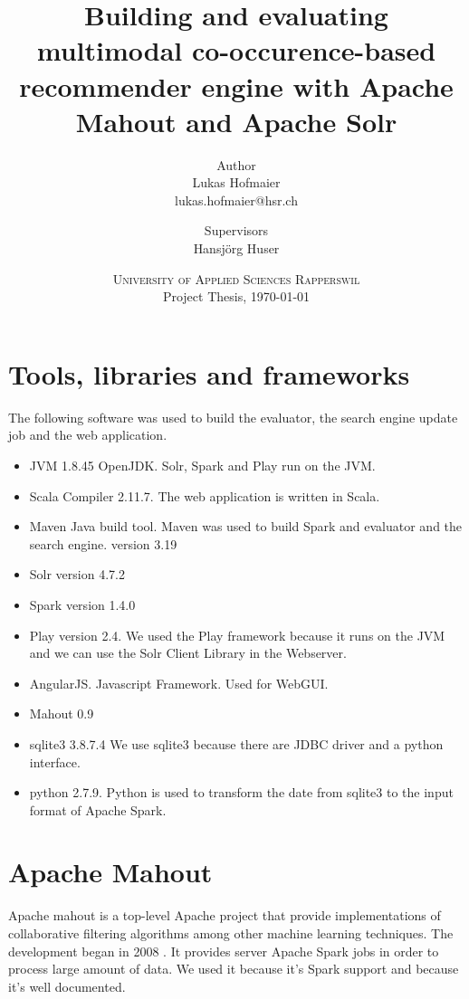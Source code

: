 \documentclass[twoside,a4paper]{article}
\title{ Building and evaluating multimodal co-occurence-based recommender engine with Apache Mahout and Apache Solr }
\author{
	Author \\
	Lukas Hofmaier \\
	lukas.hofmaier@hsr.ch
 	\and
	Supervisors \\
        Hansj\"org Huser
}
\date{
	\textsc{University of Applied Sciences Rapperswil}\\
	Project Thesis,
	\today
}
\begin{document}
\lstset{
basicstyle=\ttfamily,
columns=fullflexible,
keepspaces=true,
captionpos=b
}

\maketitle
\tableofcontents








\appendix

\section{Tools, libraries and frameworks}

The following software was used to build the evaluator, the search engine update job and the web application.
\begin{itemize}
\item JVM 1.8.45 OpenJDK. Solr, Spark and Play run on the JVM.
\item Scala Compiler 2.11.7. The web application is written in Scala.
\item Maven Java build tool. Maven was used to build Spark and evaluator and the search engine. version 3.19
\item Solr version 4.7.2
\item Spark version 1.4.0
\item Play version 2.4. We used the Play framework because it runs on the JVM and we can use the Solr Client Library in the Webserver.
\item AngularJS. Javascript Framework. Used for WebGUI.
\item Mahout 0.9 
\item sqlite3 3.8.7.4 We use sqlite3 because there are JDBC driver and a python interface.
\item python 2.7.9. Python is used to transform the date from sqlite3 to the input format of Apache Spark.
\end{itemize}

\section{Apache Mahout}
\label{sec:mahout}

Apache mahout is a top-level Apache project that provide implementations of collaborative filtering algorithms among other machine learning techniques. The development began in 2008 \cite{Owen}. It provides server Apache Spark jobs in order to process large amount of data. We used it because it's Spark support and because it's well documented.
\end{document}
